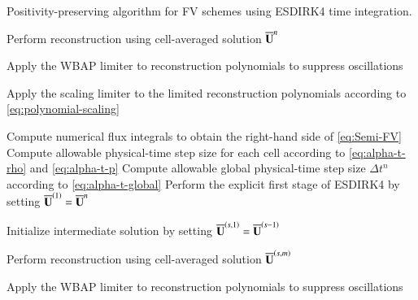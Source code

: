  \begin{algorithm}[htbp!]
        \renewcommand{\baselinestretch}{1.3}\selectfont
 	\caption{Positivity-preserving algorithm for FV schemes using ESDIRK4 time integration.}  
 	\label{alg:pp-algorithm}
 	\begin{algorithmic}[1] 
        
        \State Perform reconstruction using cell-averaged solution $\overline{\mathbf{U}}^{n}$ %
        
        \State Apply the WBAP limiter to reconstruction polynomials to suppress oscillations
        
        \State Apply the scaling limiter to the limited reconstruction polynomials according to \eqref{eq:polynomial-scaling}
                
        \State Compute numerical flux integrals to obtain the right-hand side of \eqref{eq:Semi-FV} %
        \State Compute allowable physical-time step size for each cell according to \eqref{eq:alpha-t-rho} and \eqref{eq:alpha-t-p}
        \State Compute allowable global physical-time step size $\Delta t^n$ according to \eqref{eq:alpha-t-global}
        \State Perform the explicit first stage of ESDIRK4 by setting $\overline{\mathbf{U}}^{\left(1\right)} =\overline{\mathbf{U}}^{n}$ %

        \State Initialize intermediate solution by setting $\overline{\mathbf{U}}^{\left(s,1\right)}=\overline{\mathbf{U}}^{\left(s-1\right)}$ 
        

        \State Perform reconstruction using cell-averaged solution $\overline{\mathbf{U}}^{\left(s,m\right)}$ %

        \State Apply the WBAP limiter to reconstruction polynomials to suppress oscillations
        

\end{algorithmic}
\end{algorithm}
